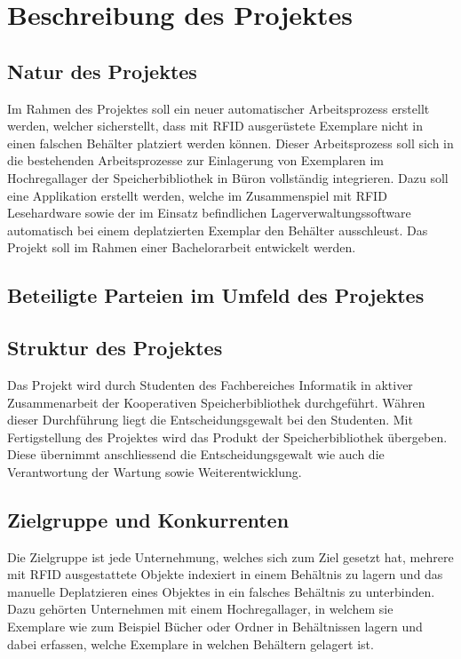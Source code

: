 \chapter{Beschreibung des Projektes}

\section{Natur des Projektes}
Im Rahmen des Projektes soll ein neuer automatischer Arbeitsprozess erstellt werden, welcher sicherstellt, dass mit RFID ausgerüstete Exemplare nicht in einen falschen Behälter platziert werden können. Dieser Arbeitsprozess soll sich in die bestehenden Arbeitsprozesse zur Einlagerung von Exemplaren im Hochregallager der Speicherbibliothek in Büron vollständig integrieren. Dazu soll eine Applikation erstellt werden, welche im Zusammenspiel mit RFID Lesehardware sowie der im Einsatz befindlichen Lagerverwaltungssoftware automatisch bei einem deplatzierten Exemplar den Behälter ausschleust. Das Projekt soll im Rahmen einer Bachelorarbeit entwickelt werden.

\section{Beteiligte Parteien im Umfeld des Projektes}

\section{Struktur des Projektes}
Das Projekt wird durch Studenten des Fachbereiches Informatik in aktiver Zusammenarbeit der Kooperativen Speicherbibliothek durchgeführt. Währen dieser Durchführung liegt die Entscheidungsgewalt bei den Studenten. Mit Fertigstellung des Projektes wird das Produkt der Speicherbibliothek übergeben. Diese übernimmt anschliessend die Entscheidungsgewalt wie auch die Verantwortung der Wartung sowie Weiterentwicklung.

\section{Zielgruppe und Konkurrenten}
Die Zielgruppe ist jede Unternehmung, welches sich zum Ziel gesetzt hat, mehrere mit RFID ausgestattete Objekte indexiert in einem Behältnis zu lagern und das manuelle Deplatzieren eines Objektes in ein falsches Behältnis zu unterbinden.
Dazu gehörten Unternehmen mit einem Hochregallager, in welchem sie Exemplare wie zum Beispiel Bücher oder Ordner in Behältnissen lagern und dabei erfassen, welche Exemplare in welchen Behältern gelagert ist.

